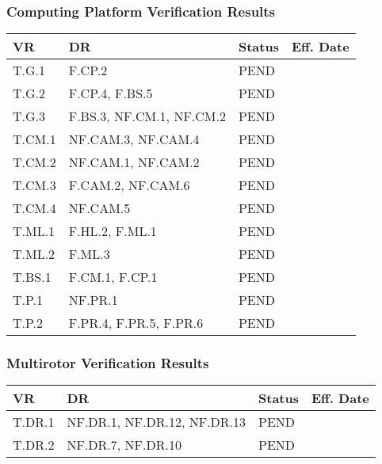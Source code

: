 \documentclass[10pt,letterpaper]{article}
\begin{document}
\subsubsection{Computing Platform Verification Results}
\begin{table}[H]
	\centering
	\begin{tabular}{llll}
	\hline
	\textbf{VR} & \textbf{DR} & \textbf{Status} & \textbf{Eff. Date} \\
	\hline
	T.G.1 & F.CP.2 & PEND   & \\
	T.G.2 & F.CP.4, F.BS.5 & PEND   & \\
	T.G.3 & F.BS.3, NF.CM.1, NF.CM.2 & PEND   & \\
	
	T.CM.1 & NF.CAM.3, NF.CAM.4   & PEND   & \\
	T.CM.2 & NF.CAM.1, NF.CAM.2   & PEND   & \\
	T.CM.3 & F.CAM.2, NF.CAM.6   & PEND   & \\
	T.CM.4 & NF.CAM.5   & PEND   & \\
	
	T.ML.1 & F.HL.2, F.ML.1 & PEND   & \\
    T.ML.2 & F.ML.3 & PEND   & \\
    
    T.BS.1 & F.CM.1, F.CP.1 & PEND   & \\
    
    T.P.1 & NF.PR.1 & PEND   & \\
    T.P.2 & F.PR.4, F.PR.5, F.PR.6 & PEND   & \\
	\hline
	\end{tabular}
\end{table}

\subsubsection{Multirotor Verification Results}
\begin{table}[H]
	\centering
	\begin{tabular}{llll}
	\hline
	\textbf{VR} & \textbf{DR} & \textbf{Status} & \textbf{Eff. Date} \\
	\hline
    T.DR.1 & NF.DR.1, NF.DR.12, NF.DR.13  & PEND   & \\
	T.DR.2 & NF.DR.7, NF.DR.10 & PEND   & \\
	\hline
	\end{tabular}
\end{table}

\clearpage
{}



\end{document}
